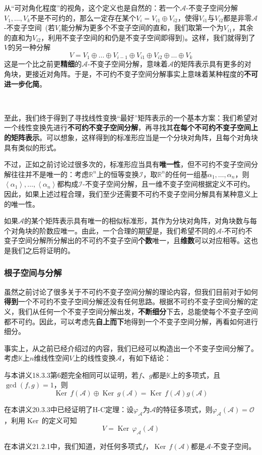 \documentclass[a4paper,UTF8,fontset=windows,AutoFakeBold]{ctexart}
\DeclareMathOperator{\Ker}{Ker\,}
\newcommand*{\ma}{\mathcal{A}}
\newcommand*{\mi}{\mathcal{I}}
\newcommand*{\mo}{\mathcal{O}}
\begin{document}
从``可对角化程度''的视角，这个定义也是自然的：若一个$\ma$-不变子空间分解$V_1,\dots,V_k$不是不可约的，那么一定存在某个$V_i=V_{i1}\oplus V_{i2}$，使得$V_{i1}$与$V_{i2}$都是非零$\ma$-不变子空间\ (若$V_i$能分解为更多个不变子空间的直和，我们取第一个为$V_{i1}$，其余的直和为$V_{i2}$，利用不变子空间的和仍是不变子空间即得到)。这样，我们就得到了$V$的另一种分解
$$V=V_1\oplus\dots\oplus V_{i-1}\oplus V_{i1}\oplus V_{i2}\oplus\dots\oplus V_k$$
这是一个比之前更\textbf{精细}的$\ma$-不变子空间分解，意味着$\ma$的矩阵表示具有更多的对角块，更接近对角阵。于是，不可约不变子空间分解事实上意味着某种程度的\textbf{不可进一步化简}。

\

至此，我们终于得到了寻找线性变换``最好''矩阵表示的一个基本方案：我们希望对一个线性变换先进行\textbf{不可约不变子空间分解}，再寻找其\textbf{在每个不可约不变子空间上的矩阵表示}。可以想象，这样得到的标准形应当是一个分块对角阵，且每个对角块具有类似的形式。

不过，正如之前讨论过很多次的，标准形应当具有\textbf{唯一性}，但不可约不变子空间分解往往并不是唯一的：考虑$\mathbb{R}^n$上的恒等变换$\mi$，取$\mathbb{R}^n$的任何一组基$\alpha_1,\dots,\alpha_n$，则$\left<\alpha_1\right>,\dots,\left<\alpha_n\right>$都构成$\mi$-不变子空间分解，且一维不变子空间根据定义不可约。因此，如果上述过程合理，我们至少还需要不可约不变子空间分解具有某种意义上的唯一性。

如果$\ma$的某个矩阵表示具有唯一的相似标准形，其作为分块对角阵，对角块数与每个对角块的阶数应唯一。由此，一个合理的期望是，我们希望不同的$\ma$-不可约不变子空间分解所分解出的不可约不变子空间\textbf{个数}唯一，且\textbf{维数}可以对应相等。这也是我们之后将证明的。

\subsubsection{根子空间与分解}
虽然之前讨论了很多关于不可约不变子空间分解的理论内容，但我们目前对于如何\textbf{得到}一个不可约不变子空间分解还没有任何思路。根据不可约不变子空间分解的定义，我们从任何一个不变子空间分解出发，\textbf{不断细分}下去，总能使每个不变子空间都不可约。因此，可以考虑先\textbf{自上而下}地得到一个不变子空间分解，再看如何进行细分。

事实上，从之前已经介绍过的内容，我们已经可以构造出一个不变子空间分解了。考虑$\mathbb{K}$上$n$维线性空间$V$上的线性变换$\ma$，有如下结论：
\begin{compactitem}
    \item 与本讲义18.3.3第6题完全相同可以证明，若$f$、$g$都是$\mathbb{K}$上的多项式，且$\gcd(f,g)=1$，则
    $$\Ker f(\ma)\oplus\Ker g(\ma)=\Ker f(\ma)g(\ma)$$
    \item 在本讲义20.3.3中已经证明了H-C定理：设$\varphi_\ma$为$\ma$的特征多项式，则$\varphi_\ma(\ma)=\mo$，利用$\Ker$的定义可知
    $$V=\Ker\varphi_\ma(\ma)$$
    \item 在本讲义21.2.1中，我们知道，对任何多项式$f$，$\Ker f(\ma)$都是$\ma$-不变子空间。
\end{compactitem}
\end{document}
